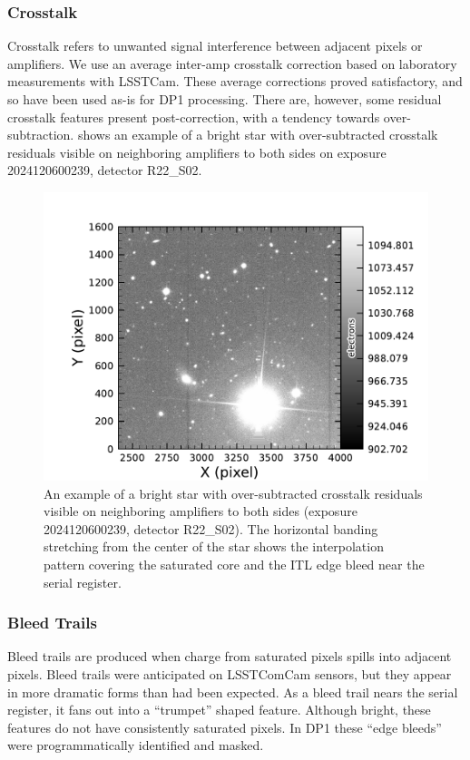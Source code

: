 \subsubsection{Crosstalk}
Crosstalk refers to unwanted signal interference between adjacent pixels or amplifiers.
We use an average inter-amp crosstalk correction based on laboratory measurements with LSSTCam.
These average corrections proved satisfactory, and so have been used as-is for DP1 processing.
There are, however, some residual crosstalk features present post-correction, with a tendency towards over-subtraction.
 shows an example  of a bright star with over-subtracted crosstalk residuals visible on neighboring amplifiers to both sides on exposure 2024120600239, detector R22\_S02.
\begin{figure}[htb!]
  \centering
  \includegraphics[width=0.98\linewidth]{dp1_isr_anomalies-crosstalk_residual}
  \caption{An example of a bright star with over-subtracted crosstalk residuals visible on neighboring amplifiers to both sides (exposure 2024120600239, detector R22\_S02).
  The horizontal banding stretching from the center of the star shows the interpolation pattern covering the saturated core and the ITL edge bleed near the serial register.}
  \label{fig:crosstalk_residual}
\end{figure}

\subsubsection{Bleed Trails}
Bleed trails are produced when charge from saturated pixels spills into adjacent pixels.
Bleed trails were anticipated on LSSTComCam sensors, but they appear in more dramatic forms than had been expected.
As a bleed trail nears the serial register, it fans out into a ``trumpet'' shaped feature.
Although bright, these features do not have consistently saturated pixels.
In DP1 these ``edge bleeds'' were programmatically identified and masked.

